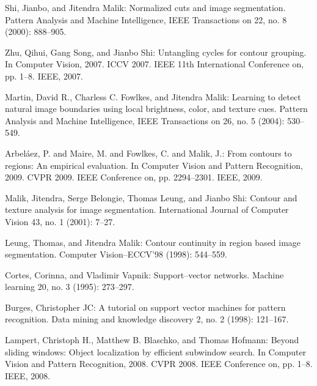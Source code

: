 \documentclass{SMBV13}
\begin{document}
\begin{thebibliography}{AA}
 Shi, Jianbo, and Jitendra Malik: Normalized cuts and image segmentation. Pattern Analysis and Machine Intelligence, IEEE Transactions on 22, no. 8 (2000): 888--905.

 Zhu, Qihui, Gang Song, and Jianbo Shi: Untangling cycles for contour grouping. In Computer Vision, 2007. ICCV 2007. IEEE 11th International Conference on, pp. 1--8. IEEE, 2007.

 Martin, David R., Charless C. Fowlkes, and Jitendra Malik: Learning to detect natural image boundaries using local brightness, color, and texture cues. Pattern Analysis and Machine Intelligence, IEEE Transactions on 26, no. 5 (2004): 530--549.

 Arbel{\'a}ez, P. and Maire, M. and Fowlkes, C. and Malik, J.: From contours to regions: An empirical evaluation. In Computer Vision and Pattern Recognition, 2009. CVPR 2009. IEEE Conference on, pp. 2294--2301. IEEE, 2009.

 Malik, Jitendra, Serge Belongie, Thomas Leung, and Jianbo Shi: Contour and texture analysis for image segmentation. International Journal of Computer Vision 43, no. 1 (2001): 7--27.

 Leung, Thomas, and Jitendra Malik: Contour continuity in region based image segmentation. Computer Vision--ECCV'98 (1998): 544--559.

 Cortes, Corinna, and Vladimir Vapnik: Support--vector networks. Machine learning 20, no. 3 (1995): 273--297.

 Burges, Christopher JC: A tutorial on support vector machines for pattern recognition. Data mining and knowledge discovery 2, no. 2 (1998): 121--167.

 Lampert, Christoph H., Matthew B. Blaschko, and Thomas Hofmann: Beyond sliding windows: Object localization by efficient subwindow search. In Computer Vision and Pattern Recognition, 2008. CVPR 2008. IEEE Conference on, pp. 1--8. IEEE, 2008.

\end{thebibliography}

\end{document}
